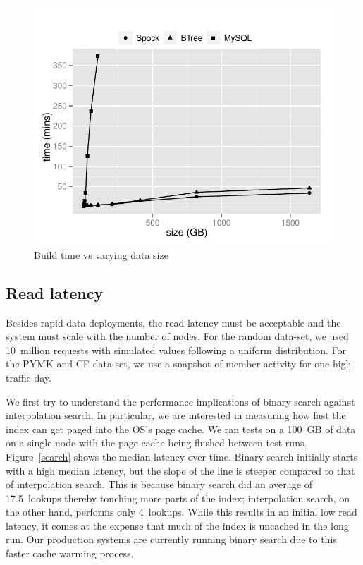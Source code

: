 \begin{figure}
  \centering
    \includegraphics[scale=0.55]{images/build.pdf}
  \caption{Build time vs varying data size}
  \label{build}
\end{figure}

\subsection{Read latency}

Besides rapid data deployments, the read latency must be acceptable
and the system must scale with the number of nodes. For the random
data-set, we used 10~million requests with simulated values following
a uniform distribution. For the PYMK and CF data-set, we use a
snapshot of member activity for one high traffic day.

We first try to understand the performance implications of binary
search against interpolation search. In particular, we are interested
in measuring how fast the index can get paged into the OS's page
cache. We ran tests on a 100~GB of data on a single node with the page
cache being flushed between test runs. Figure~\ref{search} shows the
median latency over time. Binary search initially starts with a high
median latency, but the slope of the line is steeper compared to that
of interpolation search. This is because binary search did an average
of 17.5~lookups thereby touching more parts of the index;
interpolation search, on the other hand, performs only 4~lookups.
While this results in an initial low read latency, it comes at the
expense that much of the index is uncached in the long run. Our
production systems are currently running binary search due to this
faster cache warming process.  

